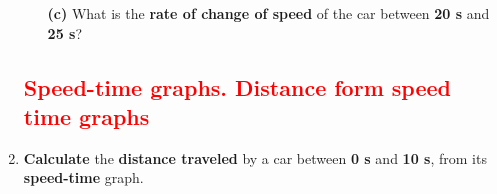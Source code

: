 \documentclass[A4,12pt]{article}
\begin{document}
\begin{enumerate}[label=\bfseries (\arabic*)]
\begin{itemize}
    
    \item[\bf (c)] What is the \textbf{rate of change of speed} of the car between \textbf{20 s} and \textbf{25 s}? %
    
\end{itemize}












\subsection*{\textcolor{red}{Speed-time graphs. Distance form speed time graphs}}











\item \textbf{Calculate} the \textbf{distance traveled} by a car between \textbf{0 s} and \textbf{10 s}, from its \textbf{speed-time} graph. \cite{Triguero}


\end{enumerate}
\end{document}
